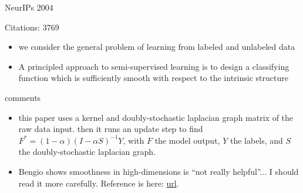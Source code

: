 \documentclass[11pt]{article}
\begin{document}
\vspace{2cm}

\noindent NeurIPs 2004

\noindent Citations: 3769

\begin{itemize}
\item we consider the general problem of learning from labeled and unlabeled data
\item A principled approach to semi-supervised learning is to design a classifying function which is sufficiently smooth with respect to the intrinsic structure 
\end{itemize}

\noindent comments
\begin{itemize}
\item this paper uses a kernel and doubly-stochastic laplacian graph matrix of the raw data input. then it runs an update step to find $F^* = (1 - \alpha)(I - \alpha S)^{-1}Y$, with $F$ the model output, $Y$ the labels, and $S$ the doubly-stochastic laplacian graph.
\item Bengio shows smoothness in high-dimensions is ``not really helpful''... I should read it more carefully. Reference is here: \href{http://cseweb.ucsd.edu/~gary/cs200/s12/bengio-lecun-07.pdf}{url}.
\end{itemize}
\end{document}
